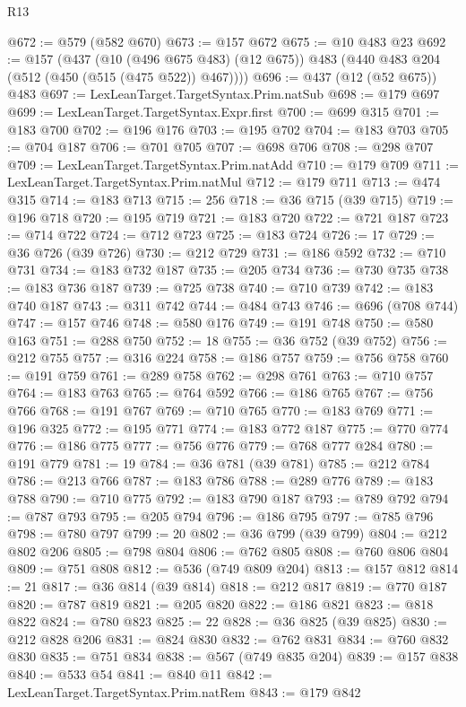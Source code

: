 \begin{lexlean}{R13}
\begin{coremodule}
@672 := @579 (@582 @670)
@673 := @157 @672
@675 := @10 @483 @23
@692 := @157
    (@437
      (@10 (@496 @675 @483) (@12 @675))
      @483
      (@440 @483 @204 (@512 (@450 (@515 (@475 @522)) @467))))
@696 := @437 (@12 (@52 @675)) @483
@697 := LexLeanTarget.TargetSyntax.Prim.natSub
@698 := @179 @697
@699 := LexLeanTarget.TargetSyntax.Expr.first
@700 := @699 @315
@701 := @183 @700
@702 := @196 @176
@703 := @195 @702
@704 := @183 @703
@705 := @704 @187
@706 := @701 @705
@707 := @698 @706
@708 := @298 @707
@709 := LexLeanTarget.TargetSyntax.Prim.natAdd
@710 := @179 @709
@711 := LexLeanTarget.TargetSyntax.Prim.natMul
@712 := @179 @711
@713 := @474 @315
@714 := @183 @713
@715 := 256
@718 := @36 @715 (@39 @715)
@719 := @196 @718
@720 := @195 @719
@721 := @183 @720
@722 := @721 @187
@723 := @714 @722
@724 := @712 @723
@725 := @183 @724
@726 := 17
@729 := @36 @726 (@39 @726)
@730 := @212 @729
@731 := @186 @592
@732 := @710 @731
@734 := @183 @732 @187
@735 := @205 @734
@736 := @730 @735
@738 := @183 @736 @187
@739 := @725 @738
@740 := @710 @739
@742 := @183 @740 @187
@743 := @311 @742
@744 := @484 @743
@746 := @696 (@708 @744)
@747 := @157 @746
@748 := @580 @176
@749 := @191 @748
@750 := @580 @163
@751 := @288 @750
@752 := 18
@755 := @36 @752 (@39 @752)
@756 := @212 @755
@757 := @316 @224
@758 := @186 @757
@759 := @756 @758
@760 := @191 @759
@761 := @289 @758
@762 := @298 @761
@763 := @710 @757
@764 := @183 @763
@765 := @764 @592
@766 := @186 @765
@767 := @756 @766
@768 := @191 @767
@769 := @710 @765
@770 := @183 @769
@771 := @196 @325
@772 := @195 @771
@774 := @183 @772 @187
@775 := @770 @774
@776 := @186 @775
@777 := @756 @776
@779 := @768 @777 @284
@780 := @191 @779
@781 := 19
@784 := @36 @781 (@39 @781)
@785 := @212 @784
@786 := @213 @766
@787 := @183 @786
@788 := @289 @776
@789 := @183 @788
@790 := @710 @775
@792 := @183 @790 @187
@793 := @789 @792
@794 := @787 @793
@795 := @205 @794
@796 := @186 @795
@797 := @785 @796
@798 := @780 @797
@799 := 20
@802 := @36 @799 (@39 @799)
@804 := @212 @802 @206
@805 := @798 @804
@806 := @762 @805
@808 := @760 @806 @804
@809 := @751 @808
@812 := @536 (@749 @809 @204)
@813 := @157 @812
@814 := 21
@817 := @36 @814 (@39 @814)
@818 := @212 @817
@819 := @770 @187
@820 := @787 @819
@821 := @205 @820
@822 := @186 @821
@823 := @818 @822
@824 := @780 @823
@825 := 22
@828 := @36 @825 (@39 @825)
@830 := @212 @828 @206
@831 := @824 @830
@832 := @762 @831
@834 := @760 @832 @830
@835 := @751 @834
@838 := @567 (@749 @835 @204)
@839 := @157 @838
@840 := @533 @54
@841 := @840 @11
@842 := LexLeanTarget.TargetSyntax.Prim.natRem
@843 := @179 @842

\end{coremodule}
\end{lexlean}
